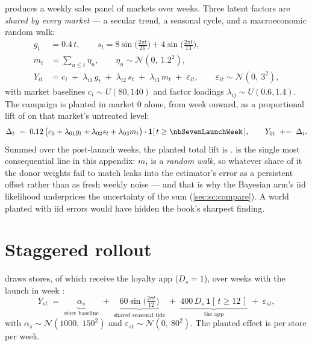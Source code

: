  produces a weekly sales panel of \nbSevenNDmas{} markets over
\nbSevenNWeeks{} weeks. Three latent factors are \emph{shared by every market} --- a secular trend,
a seasonal cycle, and a macroeconomic random walk:
%
\begin{align}
  g_t &= 0.4\,t, \qquad
  s_t = 8\sin\!\Big(\tfrac{2\pi t}{26}\Big) + 4\sin\!\Big(\tfrac{2\pi t}{13}\Big), \label{eq:app:geo_gs}\\
  m_t &= \sum_{u \le t} \eta_u, \qquad \eta_u \sim \mathcal N\!\left(0,\ 1.2^{2}\right),
        \label{eq:app:geo_macro}\\
  Y_{it} &= c_i \;+\; \lambda_{i1}\,g_t \;+\; \lambda_{i2}\,s_t \;+\; \lambda_{i3}\,m_t
           \;+\; \varepsilon_{it},
  \qquad \varepsilon_{it} \sim \mathcal N\!\left(0,\ 3^{2}\right), \label{eq:app:geo_y}
\end{align}
%
with market baselines $c_i \sim U(80, 140)$ and factor loadings $\lambda_{ij} \sim U(0.6, 1.4)$.
The campaign is planted in market $0$ alone, from week \nbSevenLaunchWeek{} onward, as a
proportional lift of \pc{\nbSevenLiftPct} on that market's untreated level:
%
\begin{equation}
  \Delta_t \;=\; 0.12 \,\big(c_0 + \lambda_{01} g_t + \lambda_{02} s_t + \lambda_{03} m_t\big)
  \cdot \mathbf 1[\,t \ge \nbSevenLaunchWeek\,],
  \qquad Y_{0t} \;\mathrel{+}=\; \Delta_t .
  \label{eq:app:geo_lift}
\end{equation}
%
Summed over the \nbSevenNPost{} post-launch weeks, the planted total lift is
\keur{\nbSevenTrueTotal}.  is the single most consequential line in this
appendix: $m_t$ is a \emph{random walk}, so whatever share of it the donor weights fail to match
leaks into the estimator's error as a persistent offset rather than as fresh weekly noise --- and
that is why the Bayesian arm's iid likelihood underprices the uncertainty of the sum
(\cref{sec:sc:compare}). A world planted with iid errors would have hidden the book's sharpest
finding.

\section{Staggered rollout}
\label{app:dgp:did}

 draws \nbEightNStores{} stores, of which \nbEightNTreated{} receive the loyalty
app ($D_s = 1$), over \nbEightNWeeks{} weeks with the launch in week \nbEightLaunch:
%
\begin{equation}
  Y_{st} \;=\; \underbrace{\alpha_s}_{\text{store baseline}}
  \;+\; \underbrace{60 \sin\!\Big(\tfrac{2\pi t}{12}\Big)}_{\text{shared seasonal tide}}
  \;+\; \underbrace{400\, D_s\, \mathbf 1[\,t \ge 12\,]}_{\text{the app}}
  \;+\; \varepsilon_{st},
  \label{eq:app:did_y}
\end{equation}
%
with $\alpha_s \sim \mathcal N(1000,\ 150^{2})$ and
$\varepsilon_{st} \sim \mathcal N(0,\ 80^{2})$. The planted effect is \eur{\nbEightTrueEffect} per
store per week.

